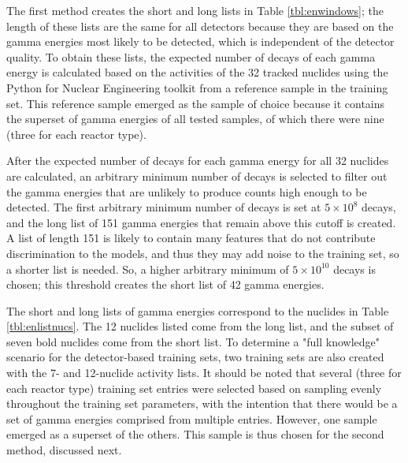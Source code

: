 The first method creates the short and long lists in Table \ref{tbl:enwindows};
the length of these lists are the same for all detectors because they are based
on the gamma energies most likely to be detected, which is independent of the
detector quality. To obtain these lists, the expected number of decays of each
gamma energy is calculated based on the activities of the 32 tracked nuclides
using the Python for Nuclear Engineering toolkit \cite{pyne} from a reference
sample in the training set.  This reference sample emerged as the sample of
choice because it contains the superset of gamma energies of all tested
samples, of which there were nine (three for each reactor type).

After the expected number of decays for each gamma energy for all 32 nuclides
are calculated, an arbitrary minimum number of decays is selected to filter out
the gamma energies that are unlikely to produce counts high enough to be
detected. The first arbitrary minimum number of decays is set at $5 \times
10^8$ decays, and the long list of 151 gamma energies that remain above this
cutoff is created.  A list of length 151 is likely to contain many features
that do not contribute discrimination to the models, and thus they may add
noise to the training set, so a shorter list is needed.  So, a higher arbitrary
minimum of $5 \times 10^{10}$ decays is chosen; this threshold creates the
short list of 42 gamma energies. 

The short and long lists of gamma energies correspond to the nuclides in Table
\ref{tbl:enlistnucs}. The 12 nuclides listed come from the long list, and the
subset of seven bold nuclides come from the short list.  To determine a "full
knowledge" scenario for the detector-based training sets, two training sets are
also created with the 7- and 12-nuclide activity lists.  It should be noted
that several (three for each reactor type) training set entries were selected
based on sampling evenly throughout the training set parameters, with the
intention that there would be a set of gamma energies comprised from multiple
entries. However, one sample emerged as a superset of the others. This sample
is thus chosen for the second method, discussed next.

